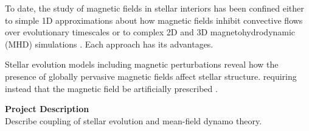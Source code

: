 \documentclass[12pt,a4paper]{article}
\begin{document}
To date, the study of magnetic fields in stellar interiors has been confined either to simple 1D approximations about how magnetic fields inhibit convective flows over evolutionary timescales \citep{GT66,LS95} or to complex 2D and 3D magnetohydrodynamic (MHD) simulations \citep[e.g.,][]{Brandenburg2005, Stein2012}. Each approach has its advantages. 

Stellar evolution models including magnetic perturbations \citep[e.g.,][]{FC12b} reveal how the presence of globally pervasive magnetic fields affect stellar structure. requiring instead that the magnetic field be artificially prescribed \citep[e.g.,][]{MM01,FC12b,FC13}. 



%

\clearpage

{\bf \large Project Description} \\
Describe coupling of stellar evolution and mean-field dynamo theory. 
\end{document}
